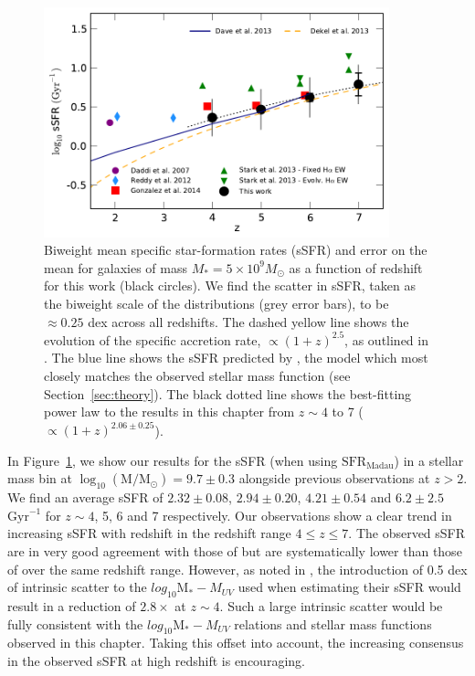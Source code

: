 \begin{figure}
\centering
\includegraphics[width=100mm]{plots/fig13.pdf}
\caption[Biweight mean specific star-formation rates (sSFR) and error on the mean for galaxies of mass $M_{*} = 5 \times 10^9 M_{\odot}$ as a function of redshift for this work (black circles).]{Biweight mean specific star-formation rates (sSFR) and error on the mean for galaxies of mass $M_{*} = 5 \times 10^9 M_{\odot}$ as a function of redshift for this work (black circles). We find the scatter in sSFR, taken as the biweight scale of the distributions (grey error bars), to be $\approx 0.25$ dex across all redshifts. The dashed yellow line shows the evolution of the specific accretion rate, $\propto (1 + z)^{2.5}$, as outlined in \citet{Dekel:2013id}. The blue line shows the sSFR predicted by \citet{Dave:2013bf}, the model which most closely matches the observed stellar mass function (see Section~\ref{sec:theory}). The black dotted line shows the best-fitting power law to the results in this chapter from $z \sim 4$ to 7 ($\propto (1 + z)^{2.06 \pm 0.25}$).}
\label{fig:ssfr_evolution}
\end{figure}

In Figure~\ref{fig:ssfr_evolution}, we show our results for the sSFR (when using $\text{SFR}_{\text{Madau}}$) in a stellar mass bin at $\log_{10}(\text{M} / \text{M}_{\odot}) = 9.7 \pm 0.3$ alongside previous observations at $z > 2$. We find an average sSFR of $2.32\pm0.08$, $2.94\pm0.20$, $4.21\pm0.54$ and $6.2\pm2.5$ $\text{Gyr}^{-1}$ for $z\sim 4$, 5, 6 and 7 respectively. Our observations show a clear trend in increasing sSFR with redshift in the redshift range $4 \leq z \leq 7$. The observed sSFR are in very good agreement with those of \citet{Gonzalez:2014do} but are systematically lower than those of \citet{Stark:2013ix} over the same redshift range. However, as noted in \citet{Stark:2013ix}, the introduction of 0.5 dex of intrinsic scatter to the $log_{10}\text{M}_{*}-M_{UV}$ used when estimating their sSFR would result in a reduction of $2.8\times$ at $z\sim4$. Such a large intrinsic scatter would be fully consistent with the $log_{10}\text{M}_{*}-M_{UV}$ relations and stellar mass functions observed in this chapter. Taking this offset into account, the increasing consensus in the observed sSFR at high redshift is encouraging.
 
